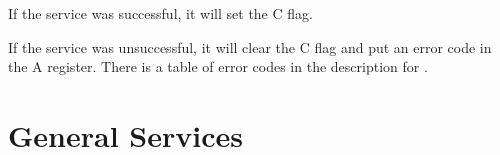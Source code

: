 If the service was successful, it will set the C flag.

If the service was unsuccessful, it will clear the C flag and put an error code
in the A register. There is a table of error codes in the description for
.



\newpage
\section{General Services}


